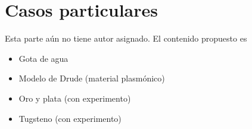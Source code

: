 \documentclass[12pts,a4paper]{book}
\begin{document}
	\chapter{Casos particulares}
	\label{ch:AEV} %
	Esta parte aún no tiene autor asignado. El contenido propuesto es
	
	\begin{itemize}
		\item Gota de agua
		\item Modelo de Drude (material plasmónico)
		\item Oro y plata (con experimento)
		\item Tugsteno (con experimento)
	\end{itemize}
	
	
	\printbibliography
	
	\printindex
	
\end{document}

